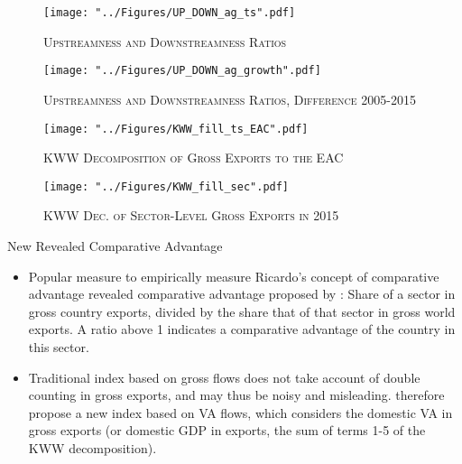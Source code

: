 \documentclass[compress]{beamer}
\begin{document}
\begin{frame}
\begin{figure}[h!] %
\centering
\caption{\label{fig:UP_DOWN_ag_ts}\textsc{Upstreamness and Downstreamness Ratios}}
\texttt{[image: "../Figures/UP\_DOWN\_ag\_ts".pdf]} %
\end{figure} 
\end{frame}

\begin{frame}
\begin{figure}[h!]
\centering
\caption{\label{fig:UP_DOWN_ag_growth}\textsc{Upstreamness and Downstreamness Ratios, Difference 2005-2015}}
\texttt{[image: "../Figures/UP\_DOWN\_ag\_growth".pdf]} %
\end{figure}
\end{frame}

\begin{frame}
\begin{figure}[h!] %
\centering
\caption{\label{fig:KWW_fill_ts_EAC}\textsc{KWW Decomposition of Gross Exports to the EAC}}
\texttt{[image: "../Figures/KWW\_fill\_ts\_EAC".pdf]} %
\end{figure}
\end{frame}


\begin{frame}
\begin{figure}[h!] %
\centering
\caption{\label{fig:KWW_fill_sec}\textsc{KWW Dec. of Sector-Level Gross Exports in 2015}}
\texttt{[image: "../Figures/KWW\_fill\_sec".pdf]} %
\end{figure}
\end{frame}

\begin{frame}{New Revealed Comparative Advantage}
\begin{itemize}
\item Popular measure to empirically measure Ricardo's concept of comparative advantage revealed comparative advantage proposed by \citet{balassa1965trade}: Share of a sector in gross country exports, divided by the share that of that sector in gross world exports. A ratio above 1 indicates a comparative advantage of the country in this sector.
\item Traditional index based on gross flows does not take account of double counting in gross exports, and may thus be noisy and misleading. \citet{koopman2014tracing} therefore propose a new index based on VA flows, which considers the domestic VA in gross exports (or domestic GDP in exports, the sum of terms 1-5 of the KWW decomposition).
\end{itemize}
\end{frame}
\end{document}
